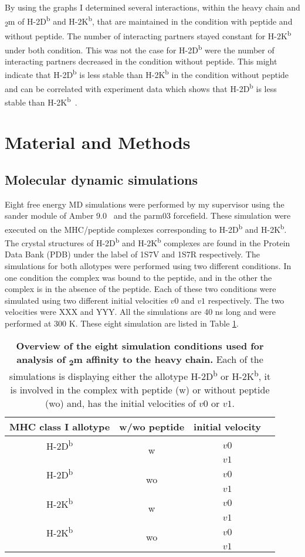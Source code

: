 \documentclass[11pt,twocolumn]{article}
\newcommand{\db}{H-2D\textsuperscript{b}\xspace}
\newcommand{\kb}{H-2K\textsuperscript{b}\xspace}
\newcommand{\btm}{\textbeta\textsubscript{2}m\xspace}
\begin{document}
By using the graphs I determined several interactions, within the heavy chain and \btm of \db and \kb, that are maintained in the condition with peptide and  without peptide. The number of interacting partners stayed constant for \kb under both condition. This was not the case for \db were the number of interacting partners decreased in the condition without peptide. This might indicate that \db is less stable than \kb in the condition without peptide and can be correlated with experiment data which shows that \db is less stable than \kb~\cite{Shields1999561}.

\section*{Material and Methods}

\subsection*{Molecular dynamic simulations}

Eight free energy MD simulations were  performed by my supervisor using the sander module of Amber 9.0~\cite{case2005amber} and the parm03 forcefield.
These simulation were executed on the  MHC/peptide complexes corresponding to  \db and  \kb. 
The crystal structures of \db and  \kb complexes are found in the Protein Data Bank (PDB) under the label of 1S7V and  1S7R respectively. 
The simulations for both allotypes were performed using two different conditions. 
In one condition the complex was bound to the peptide, and in the other  the complex is in the absence of the peptide. 
Each of these two conditions were simulated using two different initial velocities $v0$ and $v1$ respectively. The two velocities were XXX and YYY. 
All the simulations are 40 ns long and were performed  at 300 K. These eight simulation are listed in Table \ref{simulations}.


\begin{table}[H]
\caption{\textbf{Overview of the eight simulation conditions used for analysis of \btm affinity to the heavy chain.} Each of the simulations is displaying either the allotype \db or \kb, it is involved in the complex with peptide (w) or without peptide (wo) and, has the initial velocities of $v0$ or $v1$.}
\label{simulations}
\centering 
\resizebox{0.4\textwidth}{!} {
\begin{tabular}{|c|c|c|c|}  \hline
MHC class I allotype& w/wo peptide&initial velocity\\ \hline
\db&\multirow{2}{*}{w}&$v0$\\
&&$v1$\\  \hline
\db&\multirow{2}{*}{wo}&$v0$\\
&&$v1$\\  \hline
\kb&\multirow{2}{*}{w}&$v0$\\
&&$v1$\\  \hline
\kb&\multirow{2}{*}{wo}&$v0$\\
&&$v1$\\  \hline

\end{tabular}
}
\end{table}
\end{document}
